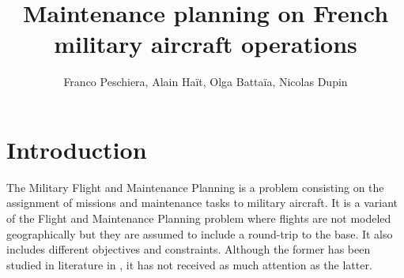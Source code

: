 \documentclass{roadef}
\begin{document}
\title{Maintenance planning on French military aircraft operations}

\def\shorttitle{Titre court}

\author{Franco Peschiera, Alain Haït, Olga Battaïa, Nicolas Dupin}




\maketitle
\thispagestyle{empty}



\section{Introduction}
    The Military Flight and Maintenance Planning is a problem consisting on the assignment of missions and maintenance tasks to military aircraft. It is a variant of the Flight and Maintenance Planning problem where flights are not modeled geographically but they are assumed to include a round-trip to the base. It also includes different objectives and constraints. Although the former has been studied in literature in \cite{Cho2011,Chastellux2017,Kozanidis2008}, it has not received as much attention as the latter.



\end{document}
